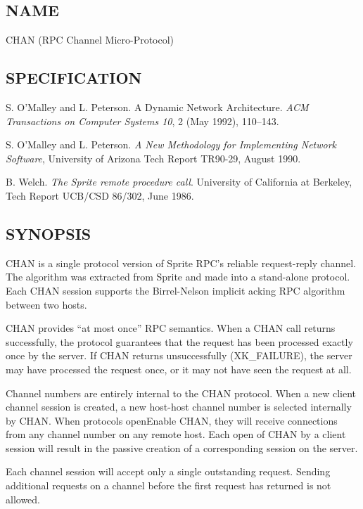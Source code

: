 %
%
%

\subsection*{NAME}

\noindent CHAN (RPC Channel Micro-Protocol)

\subsection*{SPECIFICATION}

\noindent 
S. O'Malley and L. Peterson.  A Dynamic Network Architecture.  {\it
ACM Transactions on Computer Systems 10}, 2 (May 1992), 110--143.


\medskip
\noindent  S. O'Malley and L. Peterson. {\it A New Methodology for
Implementing Network Software}, University of Arizona Tech Report
TR90-29, August 1990.

\medskip
\noindent  B. Welch. {\it The Sprite remote procedure call}. 
University of California at Berkeley, Tech Report UCB/CSD 86/302,
June 1986.

\subsection*{SYNOPSIS}

\noindent CHAN is a single protocol version of Sprite RPC's reliable
request-reply channel. The algorithm was extracted from Sprite and
made into a stand-alone protocol. Each CHAN session supports the
Birrel-Nelson implicit acking RPC algorithm between two hosts.

CHAN provides ``at most once'' RPC semantics.  When a CHAN call
returns successfully, the protocol guarantees that the request has
been processed exactly once by the server.  If CHAN returns
unsuccessfully (XK\_FAILURE), the server may have processed the
request once, or it may not have seen the request at all.  

Channel numbers are entirely internal to the CHAN protocol.  When a
new client channel session is created, a new host-host channel number
is selected internally by CHAN.  When protocols openEnable CHAN, they
will receive connections from any channel number on any remote host.  
Each open of CHAN by a client session will result in the passive
creation of a corresponding session on the server.

Each channel session will accept only a single outstanding request.
Sending additional requests on a channel before the first request has
returned is not allowed. 

